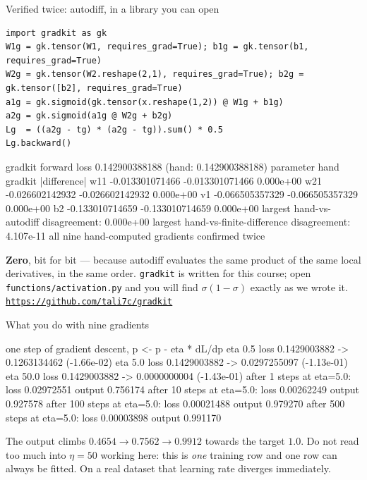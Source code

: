 \documentclass[aspectratio=169]{beamer}
\begin{document}
\begin{frame}[fragile,shrink=9]{Verified twice: autodiff, in a library you can open}
\begin{lstlisting}
import gradkit as gk
W1g = gk.tensor(W1, requires_grad=True); b1g = gk.tensor(b1, requires_grad=True)
W2g = gk.tensor(W2.reshape(2,1), requires_grad=True); b2g = gk.tensor([b2], requires_grad=True)
a1g = gk.sigmoid(gk.tensor(x.reshape(1,2)) @ W1g + b1g)
a2g = gk.sigmoid(a1g @ W2g + b2g)
Lg  = ((a2g - tg) * (a2g - tg)).sum() * 0.5
Lg.backward()
\end{lstlisting}
\begin{outblk}
gradkit forward loss  0.142900388188   (hand: 0.142900388188)
parameter    hand            gradkit          |difference|
   w11    -0.013301071466   -0.013301071466    0.000e+00
   w21    -0.026602142932   -0.026602142932    0.000e+00
   v1     -0.066505357329   -0.066505357329    0.000e+00
   b2     -0.133010714659   -0.133010714659    0.000e+00
largest hand-vs-autodiff disagreement: 0.000e+00
largest hand-vs-finite-difference disagreement: 4.107e-11
all nine hand-computed gradients confirmed twice
\end{outblk}
  \begin{center}\small
    \textbf{Zero}, bit for bit --- because autodiff evaluates the same
    product of the same local derivatives, in the same order.
    \texttt{gradkit} is written for this course; open
    \texttt{functions/activation.py} and you will find $\sigma(1-\sigma)$
    exactly as we wrote it. \texttt{\url{https://github.com/tali7c/gradkit}}
  \end{center}
\end{frame}

\begin{frame}[fragile,shrink=6]{What you do with nine gradients}
\begin{outblk}
one step of gradient descent, p <- p - eta * dL/dp
   eta   0.5   loss 0.1429003882 -> 0.1263134462   (-1.66e-02)
   eta   5.0   loss 0.1429003882 -> 0.0297255097   (-1.13e-01)
   eta  50.0   loss 0.1429003882 -> 0.0000000004   (-1.43e-01)
   after   1 steps at eta=5.0: loss 0.02972551  output 0.756174
   after  10 steps at eta=5.0: loss 0.00262249  output 0.927578
   after 100 steps at eta=5.0: loss 0.00021488  output 0.979270
   after 500 steps at eta=5.0: loss 0.00003898  output 0.991170
\end{outblk}
  \begin{center}\small
    The output climbs $0.4654 \to 0.7562 \to 0.9912$ towards the target
    $1.0$. Do not read too much into $\eta = 50$ working here: this is
    \emph{one} training row and one row can always be fitted. On a real
    dataset that learning rate diverges immediately.
  \end{center}
\end{frame}
\end{document}
